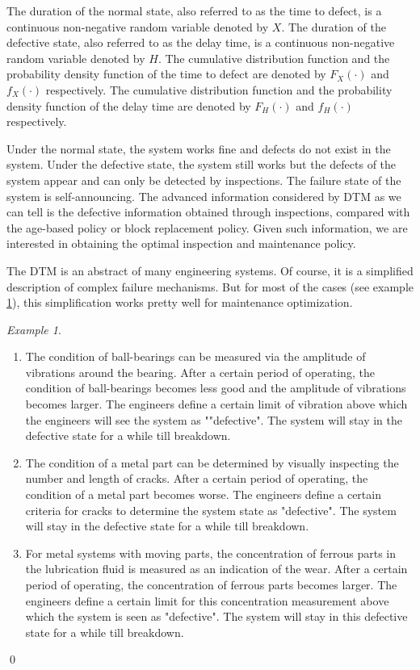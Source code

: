 \documentclass[10pt,a4paper]{article}
\theoremstyle{remark}
\newtheorem{example}{Example}
\begin{document}
The duration of the normal state, also referred to as the time to defect, is a continuous non-negative random variable denoted by $X$. The duration of the defective state, also referred to as the delay time, is a continuous non-negative random variable denoted by $H$. The cumulative distribution function and the probability density function of the time to defect are denoted by $F_{X}(\cdot)$ and $f_{X}(\cdot)$ respectively. The cumulative distribution function and the probability density function of the delay time are denoted by $F_{H}(\cdot)$ and $f_{H}(\cdot)$ respectively. 

Under the normal state, the system works fine and defects do not exist in the system. Under the defective state, the system still works but the defects of the system appear and can only be detected by inspections. The failure state of the system is self-announcing. The advanced information considered by DTM as we can tell is the defective information obtained through inspections, compared with the age-based policy or block replacement policy. Given such information, we are interested in obtaining the optimal inspection and maintenance policy.

The DTM is an abstract of many engineering systems. Of course, it is a simplified description of complex failure mechanisms. But for most of the cases (see example \ref{ex:DTM}), this simplification works pretty well for maintenance optimization.
\begin{example} \label{ex:DTM} \renewcommand{\qedsymbol}{$\lozenge$} \mbox{}
\begin{enumerate}
\item The condition of ball-bearings can be measured via the amplitude of vibrations around the bearing. After a certain period of operating, the condition of ball-bearings becomes less good and the amplitude of vibrations becomes larger. The engineers define a certain limit of vibration above which the engineers will see the system as ""defective". The system will stay in the defective state for a while till breakdown.
\item The condition of a metal part can be determined by visually inspecting the number and length of cracks. After a certain period of operating, the condition of a metal part becomes worse. The engineers define a certain criteria for cracks to determine the system state as "defective". The system will stay in the defective state for a while till breakdown.
\item For metal systems with moving parts, the concentration of ferrous parts in the lubrication fluid is measured as an indication of the wear. After a certain period of operating, the concentration of ferrous parts becomes larger. The engineers define a certain limit for this concentration measurement above which the system is seen as "defective". The system will stay in this defective state for a while till breakdown.
\end{enumerate}
\qed
\end{example}
\end{document}
